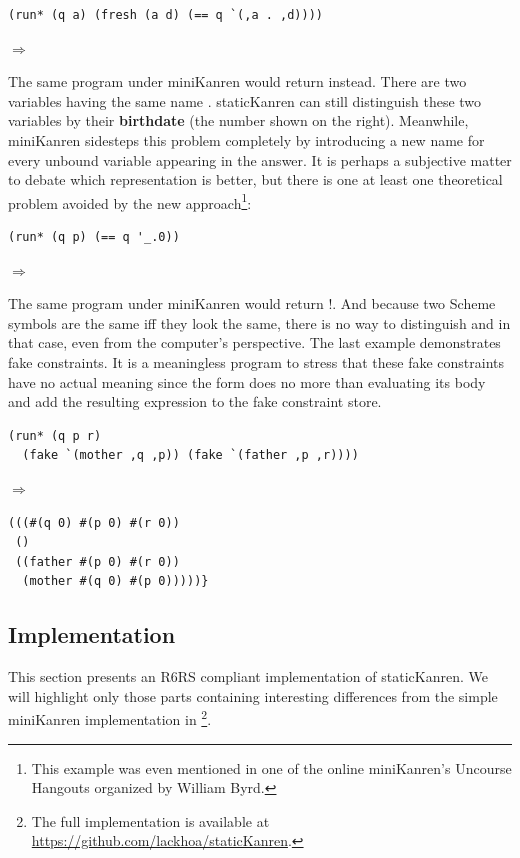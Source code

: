\begin{lstlisting}
(run* (q a) (fresh (a d) (== q `(,a . ,d))))
\end{lstlisting}
$\Rightarrow$ 

The same program under miniKanren would return  instead. There are two variables having the same name . staticKanren can still distinguish these two variables by their \textbf{birthdate} (the number shown on the right). Meanwhile, miniKanren sidesteps this problem completely by introducing a new name for every unbound variable appearing in the answer. It is perhaps a subjective matter to debate which representation is better, but there is one at least one theoretical problem avoided by the new approach\footnote{This example was even mentioned in one of the online miniKanren's Uncourse Hangouts organized by William Byrd.}:

\begin{lstlisting}
(run* (q p) (== q '_.0))
\end{lstlisting}
$\Rightarrow$ 

The same program under miniKanren would return !. And because two Scheme symbols are the same iff they look the same, there is no way to distinguish  and  in that case, even from the computer's perspective. The last example demonstrates fake constraints. It is a meaningless program to stress that these fake constraints have no actual meaning since the  form does no more than evaluating its body and add the resulting expression to the fake constraint store.
\begin{lstlisting}
(run* (q p r)
  (fake `(mother ,q ,p)) (fake `(father ,p ,r))))
\end{lstlisting}

$\Rightarrow$
\begin{lstlisting}
(((#(q 0) #(p 0) #(r 0))
 ()
 ((father #(p 0) #(r 0))
  (mother #(q 0) #(p 0)))))}
\end{lstlisting}



\subsection{Implementation}\label{static_imp}
This section presents an R6RS compliant implementation of staticKanren. We will highlight only those parts containing interesting differences from the simple miniKanren implementation in \textcite{byrdphd}\footnote{The full implementation is available at \url{https://github.com/lackhoa/staticKanren}.}.

